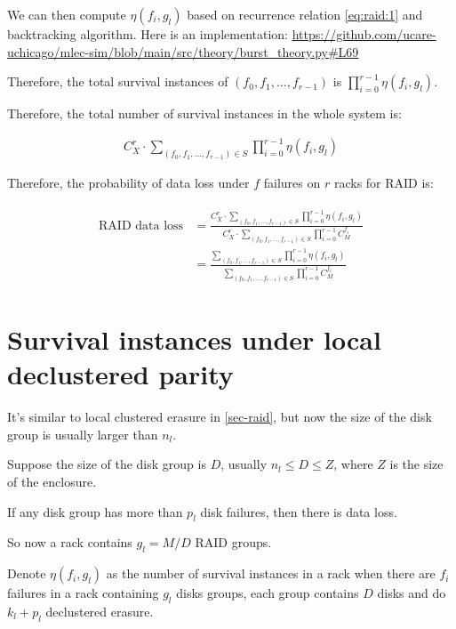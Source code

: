 \documentclass{article}
\begin{document}
We can then compute $\eta(f_i, g_l)$ based on recurrence relation \ref{eq:raid:1} and backtracking algorithm. Here is an implementation: \url{https://github.com/ucare-uchicago/mlec-sim/blob/main/src/theory/burst_theory.py#L69}

Therefore, the total survival instances of $(f_0, f_1, ..., f_{r-1})$ is $\prod_{i=0}^{r-1} \eta(f_i, g_l)$.

Therefore, the total number of survival instances in the whole system is:

\begin{eqnarray}
C_{X}^{r} \cdot \sum_{(f_0, f_1, ..., f_{r-1}) \in S} \prod_{i=0}^{r-1} \eta(f_i, g_l)
\label{eq:raid:2}
\end{eqnarray}

Therefore, the probability of data loss under $f$ failures on $r$ racks for RAID is:

\begin{eqnarray}
\begin{aligned}
\text{RAID data loss} &= \frac{C_{X}^{r} \cdot \sum_{(f_0, f_1, ..., f_{r-1}) \in S} \prod_{i=0}^{r-1} \eta(f_i, g_l)} 
{C_{X}^{r} \cdot \sum_{(f_0, f_1, ..., f_{r-1}) \in S} \prod_{i=0}^{r-1}C_{M}^{f_i}}\\
&= \frac{ \sum_{(f_0, f_1, ..., f_{r-1}) \in S} \prod_{i=0}^{r-1} \eta(f_i, g_l)} 
{\sum_{(f_0, f_1, ..., f_{r-1}) \in S} \prod_{i=0}^{r-1}C_{M}^{f_i}}
\end{aligned}
\label{eq:raid:3}
\end{eqnarray}



\section{Survival instances under local declustered parity}

It's similar to local clustered erasure in \ref{sec-raid}, but now the size of the disk group is usually larger than $n_l$. 

Suppose the size of the disk group is $D$, usually $n_l \leq D \leq Z$, where $Z$ is the size of the enclosure.

If any disk group has more than $p_l$ disk failures, then there is data loss.

So now a rack contains $g_l = M/D$ RAID groups.


Denote $\eta(f_i, g_l)$ as the number of survival instances in a rack when there are $f_i$ failures in a rack containing $g_l$ disks groups, each group contains $D$ disks and do $k_l+p_l$ declustered erasure.
\end{document}

